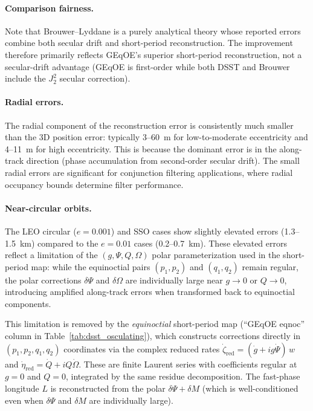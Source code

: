 \documentclass[11pt]{article}
\begin{document}
\paragraph{Comparison fairness.}
Note that Brouwer--Lyddane is a purely analytical theory whose reported
errors combine both secular drift and short-period reconstruction.
The improvement therefore primarily reflects GEqOE's superior
short-period reconstruction, not a secular-drift advantage (GEqOE is
first-order while both DSST and Brouwer include the $J_2^2$ secular
correction).

\paragraph{Radial errors.}
The radial component of the reconstruction error is consistently much smaller
than the 3D position error: typically 3--60~m for low-to-moderate eccentricity
and 4--11~m for high eccentricity. This is because the dominant error is in the
along-track direction (phase accumulation from second-order secular drift).
The small radial errors are significant for conjunction filtering applications,
where radial occupancy bounds determine filter performance.

\paragraph{Near-circular orbits.}
The LEO circular ($e = 0.001$) and SSO cases show slightly elevated errors
(1.3--1.5~km) compared to the $e = 0.01$ cases (0.2--0.7~km).
These elevated errors reflect a limitation of the $(g,\Psi,Q,\Omega)$
polar parameterization used in the short-period map: while the equinoctial
pairs $(p_1,p_2)$ and $(q_1,q_2)$ remain regular, the polar corrections
$\delta\Psi$ and $\delta\Omega$ are individually large near $g \to 0$
or $Q \to 0$, introducing amplified along-track errors when transformed
back to equinoctial components.

This limitation is removed by the \emph{equinoctial} short-period map
(``GEqOE eqnoc'' column in Table~\ref{tab:dsst_osculating}), which
constructs corrections directly in $(p_1, p_2, q_1, q_2)$ coordinates
via the complex reduced rates
$\dot\zeta_{\mathrm{red}} = (\dot g + ig\dot\Psi)\,w$ and
$\dot\eta_{\mathrm{red}} = \dot Q + iQ\dot\Omega$.
These are finite Laurent series with coefficients regular at $g = 0$ and
$Q = 0$, integrated by the same residue decomposition.  The fast-phase
longitude $L$ is reconstructed from the polar $\delta\Psi + \delta M$
(which is well-conditioned even when $\delta\Psi$ and $\delta M$
are individually large).
\end{document}
